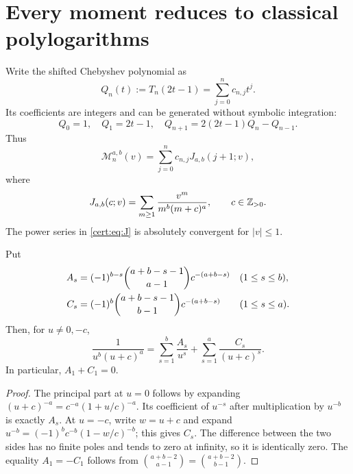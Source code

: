 \section{Every moment reduces to classical polylogarithms}
\label{cert:sec:moments}
Write the shifted Chebyshev polynomial as
\begin{equation}
 Q_n(t):=T_n(2t-1)=\sum_{j=0}^n c_{n,j}t^j.
\label{cert:eq:Q}
\end{equation}
Its coefficients are integers and can be generated without symbolic
integration:
\begin{equation}
 Q_0=1,\quad Q_1=2t-1,\quad Q_{n+1}=2(2t-1)Q_n-Q_{n-1}.
\label{cert:eq:Qrec}
\end{equation}
Thus
\begin{equation}
 \mathcal M_n^{a,b}(v)=\sum_{j=0}^n c_{n,j}J_{a,b}(j+1;v),
\label{cert:eq:momentpoly}
\end{equation}
where
\begin{equation}
 J_{a,b}(c;v)=\sum_{m\ge1}\frac{v^m}{m^b(m+c)^a},\qquad c\in\mathbb{Z}_{>0}.
\label{cert:eq:J}
\end{equation}
The power series in \eqref{cert:eq:J} is absolutely convergent for $|v|\le1$.

\begin{lemma}
\label{cert:lem:partial}
Put
\begin{align}
 A_s&=(-1)^{b-s}\binom{a+b-s-1}{a-1}c^{-(a+b-s)}
          &&(1\le s\le b),\notag\\
 C_s&=(-1)^b\binom{a+b-s-1}{b-1}c^{-(a+b-s)}
          &&(1\le s\le a).
\label{cert:eq:AC}
\end{align}
Then, for $u\ne0,-c$,
\begin{equation}
 \frac1{u^b(u+c)^a}=\sum_{s=1}^b\frac{A_s}{u^s}
                          +\sum_{s=1}^a\frac{C_s}{(u+c)^s}.
\label{cert:eq:partial}
\end{equation}
In particular, $A_1+C_1=0$.
\end{lemma}
\begin{proof}
The principal part at $u=0$ follows by expanding
$(u+c)^{-a}=c^{-a}(1+u/c)^{-a}$. Its coefficient of $u^{-s}$ after
multiplication by $u^{-b}$ is exactly $A_s$.
At $u=-c$, write $w=u+c$ and expand
$u^{-b}=(-1)^bc^{-b}(1-w/c)^{-b}$; this gives $C_s$.
The difference between the two sides has no finite poles and tends to
zero at infinity, so it is identically zero.
The equality $A_1=-C_1$ follows from
$\binom{a+b-2}{a-1}=\binom{a+b-2}{b-1}$.
\end{proof}

